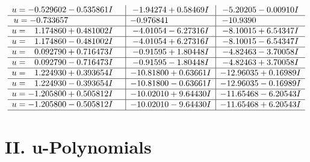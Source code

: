 \documentclass[1p]{elsarticle_modified}
\theoremstyle{definition}
\begin{document}
$$\begin{array}{c|c|c}
\begin{aligned}
u &= -0.529602 - 0.535861 I\end{aligned}
 & -1.94274 + 0.58469 I & -5.20205 - 0.00910 I \\ \hline\begin{aligned}
u &= -0.733657\phantom{ +0.000000I}\end{aligned}
 & -0.976841\phantom{ +0.000000I} & -10.9390\phantom{ +0.000000I} \\ \hline\begin{aligned}
u &= \phantom{-}1.174860 + 0.481002 I\end{aligned}
 & -4.01054 - 6.27316 I & -8.10015 + 6.54347 I \\ \hline\begin{aligned}
u &= \phantom{-}1.174860 - 0.481002 I\end{aligned}
 & -4.01054 + 6.27316 I & -8.10015 - 6.54347 I \\ \hline\begin{aligned}
u &= \phantom{-}0.092790 + 0.716473 I\end{aligned}
 & -0.91595 + 1.80448 I & -4.82463 - 3.70058 I \\ \hline\begin{aligned}
u &= \phantom{-}0.092790 - 0.716473 I\end{aligned}
 & -0.91595 - 1.80448 I & -4.82463 + 3.70058 I \\ \hline\begin{aligned}
u &= \phantom{-}1.224930 + 0.393654 I\end{aligned}
 & -10.81800 + 0.63661 I & -12.96035 + 0.16989 I \\ \hline\begin{aligned}
u &= \phantom{-}1.224930 - 0.393654 I\end{aligned}
 & -10.81800 - 0.63661 I & -12.96035 - 0.16989 I \\ \hline\begin{aligned}
u &= -1.205800 + 0.505812 I\end{aligned}
 & -10.02010 + 9.64430 I & -11.65468 - 6.20543 I \\ \hline\begin{aligned}
u &= -1.205800 - 0.505812 I\end{aligned}
 & -10.02010 - 9.64430 I & -11.65468 + 6.20543 I\\
 \hline 
 \end{array}$$\newpage
\newpage\renewcommand{\arraystretch}{1}
\centering \section*{ II. u-Polynomials}
\end{document}
